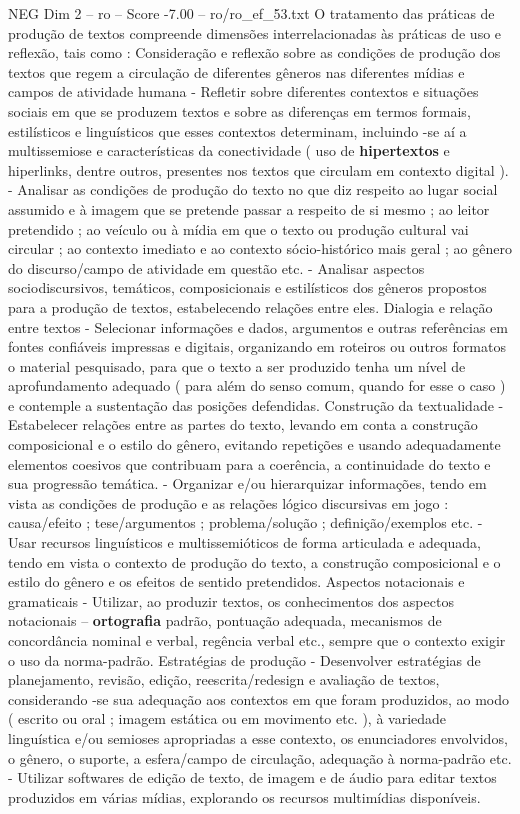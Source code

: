 \begin{textsample}{NEG Dim 2 – ro – Score -7.00 – ro/ro\_ef\_53.txt}
O tratamento das práticas de produção de textos compreende dimensões interrelacionadas às práticas de uso e reflexão, tais como : Consideração e reflexão sobre as condições de produção dos textos que regem a circulação de diferentes gêneros nas diferentes mídias e campos de atividade humana - Refletir sobre diferentes contextos e situações sociais em que se produzem textos e sobre as diferenças em termos formais, estilísticos e linguísticos que esses contextos determinam, incluindo -se aí a multissemiose e características da conectividade ( uso de \textbf{hipertextos} e hiperlinks, dentre outros, presentes nos textos que circulam em contexto digital ). - Analisar as condições de produção do texto no que diz respeito ao lugar social assumido e à imagem que se pretende passar a respeito de si mesmo ; ao leitor pretendido ; ao veículo ou à mídia em que o texto ou produção cultural vai circular ; ao contexto imediato e ao contexto sócio-histórico mais geral ; ao gênero do discurso/campo de atividade em questão etc. - Analisar aspectos sociodiscursivos, temáticos, composicionais e estilísticos dos gêneros propostos para a produção de textos, estabelecendo relações entre eles.
Dialogia e relação entre textos - Selecionar informações e dados, argumentos e outras referências em fontes confiáveis impressas e digitais, organizando em roteiros ou outros formatos o material pesquisado, para que o texto a ser produzido tenha um nível de aprofundamento adequado ( para além do senso comum, quando for esse o caso ) e contemple a sustentação das posições defendidas.
Construção da textualidade - Estabelecer relações entre as partes do texto, levando em conta a construção composicional e o estilo do gênero, evitando repetições e usando adequadamente elementos coesivos que contribuam para a coerência, a continuidade do texto e sua progressão temática. - Organizar e/ou hierarquizar informações, tendo em vista as condições de produção e as relações lógico discursivas em jogo : causa/efeito ; tese/argumentos ; problema/solução ; definição/exemplos etc. - Usar recursos linguísticos e multissemióticos de forma articulada e adequada, tendo em vista o contexto de produção do texto, a construção composicional e o estilo do gênero e os efeitos de sentido pretendidos.
Aspectos notacionais e gramaticais - Utilizar, ao produzir textos, os conhecimentos dos aspectos notacionais – \textbf{ortografia} padrão, pontuação adequada, mecanismos de concordância nominal e verbal, regência verbal etc., sempre que o contexto exigir o uso da norma-padrão.
Estratégias de produção - Desenvolver estratégias de planejamento, revisão, edição, reescrita/redesign e avaliação de textos, considerando -se sua adequação aos contextos em que foram produzidos, ao modo ( escrito ou oral ; imagem estática ou em movimento etc. ), à variedade linguística e/ou semioses apropriadas a esse contexto, os enunciadores envolvidos, o gênero, o suporte, a esfera/campo de circulação, adequação à norma-padrão etc. - Utilizar softwares de edição de texto, de imagem e de áudio para editar textos produzidos em várias mídias, explorando os recursos multimídias disponíveis.

\end{textsample}
